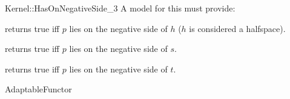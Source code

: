 \begin{ccRefFunctionObjectConcept}{Kernel::HasOnNegativeSide_3}
A model for this must provide:


{returns true iff $p$ lies on the negative side of $h$ 
($h$ is considered a halfspace).}

{returns true iff $p$ lies on the negative side of $s$.}

{returns true iff $p$ lies on the negative side of $t$.}

\ccRefines
AdaptableFunctor

\ccSeeAlso
{} \\
 \\
 \\


\end{ccRefFunctionObjectConcept}
